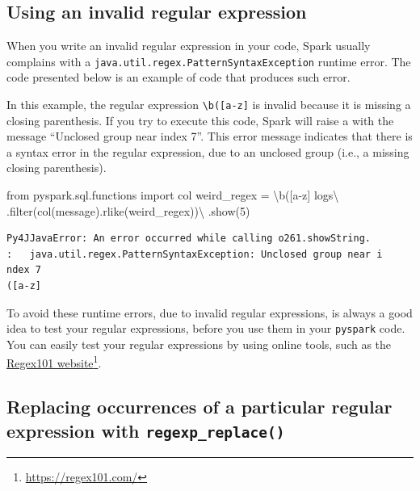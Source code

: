 \documentclass[
  11pt,
  letterpaper,
  DIV=11,
  numbers=noendperiod]{scrreprt}
\newenvironment{Shaded}{\begin{snugshade}}{\end{snugshade}}
\newcommand{\BuiltInTok}[1]{\textcolor[rgb]{0.00,0.23,0.31}{#1}}
\newcommand{\CharTok}[1]{\textcolor[rgb]{0.13,0.47,0.30}{#1}}
\newcommand{\DecValTok}[1]{\textcolor[rgb]{0.68,0.00,0.00}{#1}}
\newcommand{\ImportTok}[1]{\textcolor[rgb]{0.00,0.46,0.62}{#1}}
\newcommand{\NormalTok}[1]{\textcolor[rgb]{0.00,0.23,0.31}{#1}}
\newcommand{\OperatorTok}[1]{\textcolor[rgb]{0.37,0.37,0.37}{#1}}
\newcommand{\StringTok}[1]{\textcolor[rgb]{0.13,0.47,0.30}{#1}}
\begin{document}
\subsection{Using an invalid regular
expression}\label{using-an-invalid-regular-expression}

When you write an invalid regular expression in your code, Spark usually
complains with a \texttt{java.util.regex.PatternSyntaxException} runtime
error. The code presented below is an example of code that produces such
error.

In this example, the regular expression
\texttt{\textbackslash{}b({[}a-z{]}} is invalid because it is missing a
closing parenthesis. If you try to execute this code, Spark will raise a
with the message ``Unclosed group near index 7''. This error message
indicates that there is a syntax error in the regular expression, due to
an unclosed group (i.e., a missing closing parenthesis).

\begin{Shaded}
\begin{Highlighting}[]
\ImportTok{from}\NormalTok{ pyspark.sql.functions }\ImportTok{import}\NormalTok{ col}
\NormalTok{weird\_regex }\OperatorTok{=} \StringTok{\textquotesingle{}}\CharTok{\textbackslash{}b}\StringTok{([a{-}z]\textquotesingle{}}
\NormalTok{logs}\OperatorTok{\textbackslash{}}
\NormalTok{    .}\BuiltInTok{filter}\NormalTok{(col(}\StringTok{\textquotesingle{}message\textquotesingle{}}\NormalTok{).rlike(weird\_regex))}\OperatorTok{\textbackslash{}}
\NormalTok{    .show(}\DecValTok{5}\NormalTok{)}
\end{Highlighting}
\end{Shaded}

\begin{verbatim}
Py4JJavaError: An error occurred while calling o261.showString.
:   java.util.regex.PatternSyntaxException: Unclosed group near i
ndex 7
([a-z]
\end{verbatim}

To avoid these runtime errors, due to invalid regular expressions, is
always a good idea to test your regular expressions, before you use them
in your \texttt{pyspark} code. You can easily test your regular
expressions by using online tools, such as the
\href{https://regex101.com/}{Regex101 website}\footnote{\url{https://regex101.com/}}.

\subsection{\texorpdfstring{Replacing occurrences of a particular
regular expression with
\texttt{regexp\_replace()}}{Replacing occurrences of a particular regular expression with regexp\_replace()}}\label{sec-regexp-replace}
\end{document}
